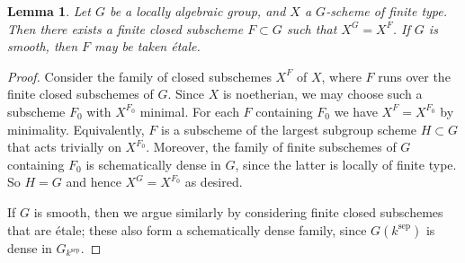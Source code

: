 \documentclass[10pt,a4paper]{amsart}
\newtheorem{lemma}[theorem]{Lemma}
\newcommand{\sep}{{\operatorname{sep}}}
\begin{document}
\begin{lemma}
\label{lem:fixed}
Let $G$ be a locally algebraic group, and $X$ 
a $G$-scheme of finite type. Then there exists 
a finite closed subscheme $F\subset G$ such that 
$X^G = X^F$. If $G$ is smooth,  then $F$ may 
be taken \'etale.
\end{lemma}

\begin{proof}
Consider the family of closed subschemes
$X^F$ of $X$, where $F$ runs over the finite closed
subschemes of $G$. Since $X$ is noetherian, we may choose such a
subscheme $F_0$ with $X^{F_0}$ minimal.
For each $F$ containing $F_0$ we have 
$X^F = X^{F_0}$ by minimality.
Equivalently, $F$ is a subscheme of the 
largest subgroup scheme $H \subset G$
that acts trivially on $X^{F_0}$. 
Moreover, the family of finite subschemes of $G$
containing $F_0$ is schematically dense in $G$, 
since the latter is locally of finite type. 
So $H = G$ and hence $X^G = X^{F_0}$ as desired.

If $G$ is smooth, then we argue similarly 
by considering finite closed subschemes that are \'etale; these 
also form a schematically dense family, since
$G(k^{\sep})$ is dense in $G_{k^{\sep}}$.
\end{proof}
\end{document}
